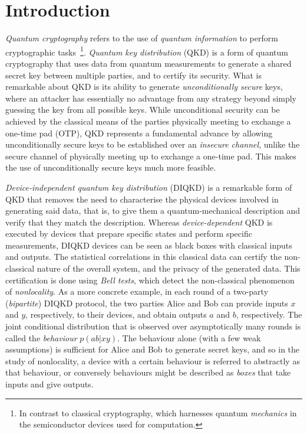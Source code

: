 \documentclass[10pt, a4paper]{article}
\numberwithin{equation}{section} %
\theoremstyle{definition}
\theoremstyle{plain}
\newcommand{\?}{\mathrel{?}} %
\begin{document}
    \section{Introduction}

    \emph{Quantum cryptography} refers to the use of \emph{quantum information} to perform cryptographic tasks~\cite{SecurityQKD, AdvancesQuantumCrypto}\footnote{In contrast to classical cryptography, which harnesses quantum \emph{mechanics} in the semiconductor devices used for computation.}. \emph{Quantum key distribution} (QKD) is a form of quantum cryptography that uses data from quantum measurements to generate a shared secret key between multiple parties, and to certify its security. What is remarkable about QKD is its ability to generate \emph{unconditionally secure} keys, where an attacker has essentially no advantage from any strategy beyond simply guessing the key from all possible keys. While unconditional security can be achieved by the classical means of the parties physically meeting to exchange a one-time pad (OTP), QKD represents a fundamental advance by allowing unconditionally secure keys to be established over an \emph{insecure channel}, unlike the secure channel of physically meeting up to exchange a one-time pad. This makes the use of unconditionally secure keys much more feasible.

    \emph{Device-independent quantum key distribution} (DIQKD) is a remarkable form of QKD that removes the need to characterise the physical devices involved in generating said data, that is, to give them a quantum-mechanical description and verify that they match the description. Whereas \emph{device-dependent} QKD is executed by devices that prepare specific states and perform specific measurements, DIQKD devices can be seen as black boxes with classical inputs and outputs. The statistical correlations in this classical data can certify the non-classical nature of the overall system, and the privacy of the generated data. This certification is done using \emph{Bell tests}, which detect the non-classical phenomenon of \emph{nonlocality}. As a more concrete example, in each round of a two-party (\emph{bipartite}) DIQKD protocol, the two parties Alice and Bob can provide inputs \(x\) and \(y\), respectively, to their devices, and obtain outputs \(a\) and \(b\), respectively. The joint conditional distribution that is observed over asymptotically many rounds is called the \emph{behaviour} \(p(ab|xy)\). The behaviour alone (with a few weak assumptions) is sufficient for Alice and Bob to generate secret keys, and so in the study of nonlocality, a device with a certain behaviour is referred to abstractly as that behaviour, or conversely behaviours might be described as \emph{boxes} that take inputs and give outputs.
\end{document}
